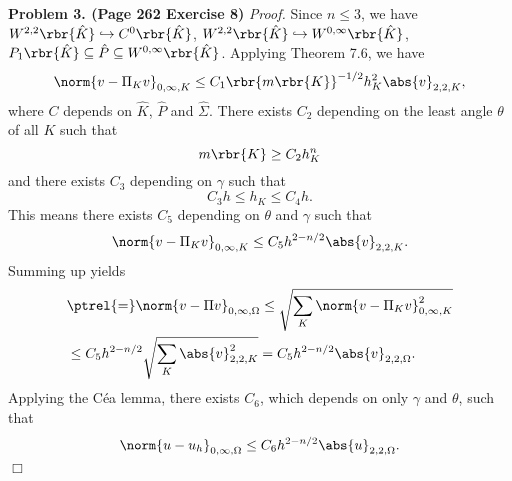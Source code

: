 \documentclass[english, nochinese]{pnote}
\begin{document}
\textbf{Problem 3. (Page 262 Exercise 8)} \textit{Proof.} Since $ n \le 3 $, we have $ W^{ 2, 2 } \rbr{\hat{K}} \hookrightarrow C^0 \rbr{\hat{K}} $, $ W^{ 2, 2 } \rbr{\hat{K}} \hookrightarrow W^{ 0, \infty } \rbr{\hat{K}} $, $ P_1 \rbr{\hat{K}} \subseteq \hat{P} \subseteq W^{ 0, \infty } \rbr{\hat{K}} $. Applying Theorem 7.6, we have
\begin{equation}
\norm{ v - \Pi_K v }_{ 0, \infty, K } \le C_1 \rbr{ m \rbr{K} }^{ -1 / 2 } h_K^2 \abs{v}_{ 2, 2, K },
\end{equation}
where $C$ depends on $\hat{K}$, $\hat{P}$ and $\hat{\Sigma}$. There exists $C_2$ depending on the least angle $\theta$ of all $K$ such that
\begin{equation}
m \rbr{K} \ge C_2 h_K^n 
\end{equation}
and there exists $C_3$ depending on $\gamma$ such that
\begin{equation}
C_3 h \le h_K \le C_4 h.
\end{equation}
This means there exists $C_5$ depending on $\theta$ and $\gamma$ such that
\begin{equation}
\norm{ v - \Pi_K v }_{ 0, \infty, K } \le C_5 h^{ 2 - n / 2 } \abs{v}_{ 2, 2, K }.
\end{equation}
Summing up yields
\begin{equation}
\begin{split}
&\ptrel{=} \norm{ v - \Pi v }_{ 0, \infty, \Omega } \le \sqrt{ \sum_K \norm{ v - \Pi_K v }_{ 0, \infty, K }^2 } \\
&\le C_5 h^{ 2 - n / 2 } \sqrt{ \sum_K \abs{v}_{ 2, 2, K }^2 } = C_5 h^{ 2 - n / 2 } \abs{v}_{ 2, 2, \Omega }.
\end{split}
\end{equation}
Applying the C\'ea lemma, there exists $C_6$, which depends on only $\gamma$ and $\theta$, such that
\begin{equation}
\norm{ u - u_h }_{ 0, \infty, \Omega } \le C_6 h^{ 2 - n / 2 } \abs{u}_{ 2, 2, \Omega }.
\end{equation}
\hfill$\Box$
\end{document}
